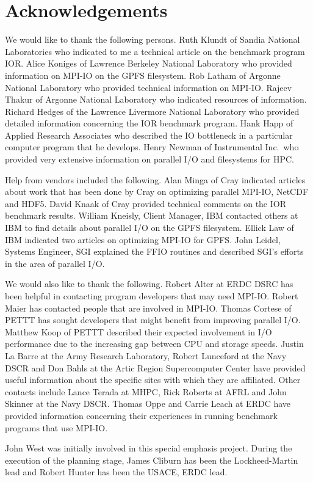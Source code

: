 \section*{Acknowledgements}

We would like to thank the following persons.
Ruth Klundt of Sandia National Laboratories who indicated to me
a technical article on the benchmark program IOR.
Alice Koniges of Lawrence Berkeley National Laboratory who provided
information on MPI-IO on the GPFS filesystem.
Rob Latham of Argonne National Laboratory who provided technical
information on MPI-IO.
Rajeev Thakur of Argonne National Laboratory who indicated
resources of information.
Richard Hedges of the Lawrence Livermore National Laboratory who
provided detailed information concerning the IOR benchmark program.
Hank Happ of Applied Research Associates who described the IO bottleneck
in a particular computer program that he develops.
Henry Newman of Instrumental Inc.\ who provided very extensive
information on parallel I/O and filesystems for HPC.

Help from vendors included the following.
Alan Minga of Cray indicated articles about work that
has been done by Cray on optimizing parallel MPI-IO, NetCDF and HDF5.
David Knaak of Cray provided technical comments on the
IOR benchmark results.
William Kneisly, Client Manager, IBM contacted others at
IBM to find details about parallel I/O on the GPFS filesystem.
Ellick Law of IBM indicated two articles on optimizing
MPI-IO for GPFS.
John Leidel, Systems Engineer, SGI explained the FFIO routines
and described SGI's efforts in the area of parallel I/O.

We would also like to thank the following.
Robert Alter at ERDC DSRC has been helpful in contacting program
developers that may need MPI-IO.
Robert Maier has contacted people that are involved in MPI-IO.
Thomas Cortese of PETTT has sought developers that might
benefit from improving parallel I/O.
Matthew Koop of PETTT described their expected involvement in
I/O performance due to the increasing gap between CPU and
storage speeds.
Justin La Barre at the Army Research Laboratory,
Robert Lunceford at the Navy DSCR and
Don Bahls at the Artic Region Supercomputer Center
have provided useful information about the
specific sites with which they are affiliated.
Other contacts include Lance Terada at MHPC,
Rick Roberts at AFRL and John Skinner at the Navy DSCR.
Thomas Oppe and Carrie Leach at ERDC have provided information
concerning their experiences in running benchmark programs
that use MPI-IO.

John West was initially involved in this special emphasis project.
During the execution of the planning stage, James Cliburn has been
the Lockheed-Martin lead and Robert Hunter has been the USACE, ERDC lead.

